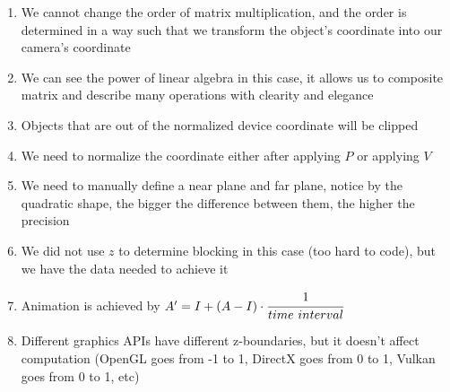 \documentclass[11pt]{article}
\begin{document}
\begin{enumerate}
    \item We cannot change the order of matrix multiplication, and the order is determined in a way such that we transform the object's coordinate into our camera's coordinate
    \item We can see the power of linear algebra in this case, it allows us to composite matrix and describe many operations with clearity and elegance
    \item Objects that are out of the normalized device coordinate will be clipped
    \item We need to normalize the coordinate either after applying $P$ or applying $V$
    \item We need to manually define a near plane and far plane, notice by the quadratic shape, the bigger the difference between them, the higher the precision
    \item We did not use $z$ to determine blocking in this case (too hard to code), but we have the data needed to achieve it
    \item Animation is achieved by $A' = I + (A - I) \cdot \cfrac{1}{time \text{ } interval}$
    \item Different graphics APIs have different z-boundaries, but it doesn't affect computation (OpenGL goes from -1 to 1, DirectX goes from 0 to 1, Vulkan goes from 0 to 1, etc)
\end{enumerate}
\end{document}
